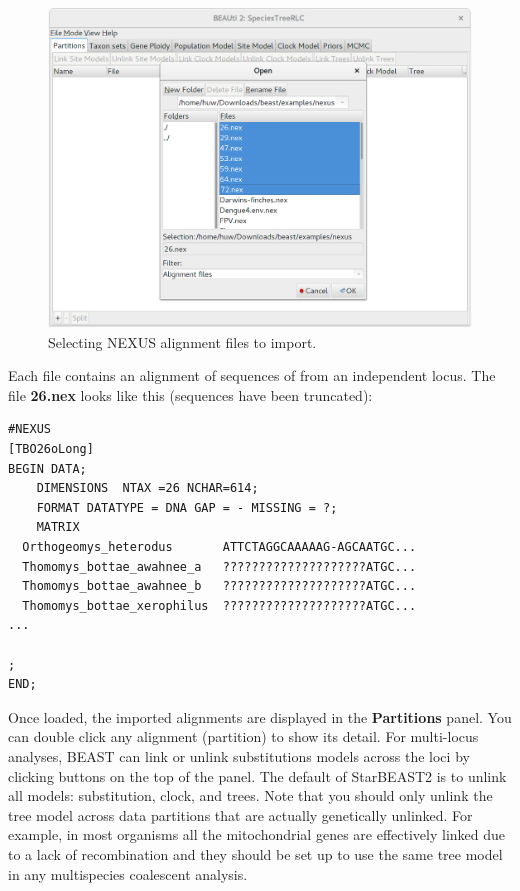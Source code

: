 \documentclass{article}
\begin{document}
\begin{figure}[htb!]
\centering
\includegraphics[width=\textwidth]{figures/beauti-import.png}
\caption{Selecting NEXUS alignment files to import.}
\label{fig:importAlignments}
\end{figure}

\clearpage

Each file contains an alignment of sequences of from an independent locus. The
file \textbf{26.nex} looks like this (sequences have been truncated):

\begin{minipage}[h]{0.7\textwidth}
\begin{verbatim}
#NEXUS
[TBO26oLong]
BEGIN DATA;
	DIMENSIONS  NTAX =26 NCHAR=614;
	FORMAT DATATYPE = DNA GAP = - MISSING = ?;
	MATRIX	
  Orthogeomys_heterodus       ATTCTAGGCAAAAAG-AGCAATGC...
  Thomomys_bottae_awahnee_a   ????????????????????ATGC...
  Thomomys_bottae_awahnee_b   ????????????????????ATGC...
  Thomomys_bottae_xerophilus  ????????????????????ATGC...
...

;
END;
\end{verbatim}
\end{minipage}

\vspace{12pt}

Once loaded, the imported alignments are displayed in the \textbf{Partitions}
panel. You can double click any alignment (partition) to show its detail. For
multi-locus analyses, BEAST can link or unlink substitutions models across the
loci by clicking buttons on the top of the panel. The default of StarBEAST2 is
to unlink all models: substitution, clock, and trees. Note
that you should only unlink the tree model across data partitions that are
actually genetically unlinked. For example, in most organisms all the
mitochondrial genes are effectively linked due to a lack of recombination and
they should be set up to use the same tree model in any multispecies coalescent
analysis.
\end{document}
